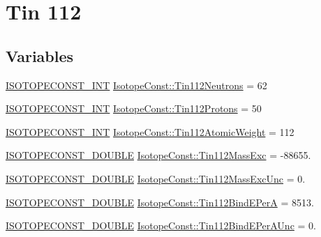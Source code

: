 \hypertarget{group___isotope_const-_tin-_sn112}{}\section{Tin 112}
\label{group___isotope_const-_tin-_sn112}
\subsection*{Variables}
\begin{DoxyCompactItemize}
\item 
\mbox{\hyperlink{group___isotope_const-_macros_ga5f18360b3e99483a35c32d789e62621c}{I\+S\+O\+T\+O\+P\+E\+C\+O\+N\+S\+T\+\_\+\+I\+NT}} \mbox{\hyperlink{group___isotope_const-_tin-_sn112_ga5b102e50de4cf92a46c036438005ad7f}{Isotope\+Const\+::\+Tin112\+Neutrons}} = 62
\item 
\mbox{\hyperlink{group___isotope_const-_macros_ga5f18360b3e99483a35c32d789e62621c}{I\+S\+O\+T\+O\+P\+E\+C\+O\+N\+S\+T\+\_\+\+I\+NT}} \mbox{\hyperlink{group___isotope_const-_tin-_sn112_ga52acc97de7e8085c5be6ff4d1b8d51a0}{Isotope\+Const\+::\+Tin112\+Protons}} = 50
\item 
\mbox{\hyperlink{group___isotope_const-_macros_ga5f18360b3e99483a35c32d789e62621c}{I\+S\+O\+T\+O\+P\+E\+C\+O\+N\+S\+T\+\_\+\+I\+NT}} \mbox{\hyperlink{group___isotope_const-_tin-_sn112_gacb992770efe07a50aa39655755792697}{Isotope\+Const\+::\+Tin112\+Atomic\+Weight}} = 112
\item 
\mbox{\hyperlink{group___isotope_const-_macros_ga8f45a7272ce02c0b4c65c44636ed719a}{I\+S\+O\+T\+O\+P\+E\+C\+O\+N\+S\+T\+\_\+\+D\+O\+U\+B\+LE}} \mbox{\hyperlink{group___isotope_const-_tin-_sn112_gaf37a77ef916f18ae717265ce1ab807c8}{Isotope\+Const\+::\+Tin112\+Mass\+Exc}} = -\/88655.
\item 
\mbox{\hyperlink{group___isotope_const-_macros_ga8f45a7272ce02c0b4c65c44636ed719a}{I\+S\+O\+T\+O\+P\+E\+C\+O\+N\+S\+T\+\_\+\+D\+O\+U\+B\+LE}} \mbox{\hyperlink{group___isotope_const-_tin-_sn112_ga1c0e76eb61719257693ba7794fb83a75}{Isotope\+Const\+::\+Tin112\+Mass\+Exc\+Unc}} = 0.
\item 
\mbox{\hyperlink{group___isotope_const-_macros_ga8f45a7272ce02c0b4c65c44636ed719a}{I\+S\+O\+T\+O\+P\+E\+C\+O\+N\+S\+T\+\_\+\+D\+O\+U\+B\+LE}} \mbox{\hyperlink{group___isotope_const-_tin-_sn112_ga118719045e5ec3ecba1e0e89c1f3de5a}{Isotope\+Const\+::\+Tin112\+Bind\+E\+PerA}} = 8513.
\item 
\mbox{\hyperlink{group___isotope_const-_macros_ga8f45a7272ce02c0b4c65c44636ed719a}{I\+S\+O\+T\+O\+P\+E\+C\+O\+N\+S\+T\+\_\+\+D\+O\+U\+B\+LE}} \mbox{\hyperlink{group___isotope_const-_tin-_sn112_gaa2000066d797bc5e51efe80e72a9baa0}{Isotope\+Const\+::\+Tin112\+Bind\+E\+Per\+A\+Unc}} = 0.

\end{DoxyCompactItemize}
